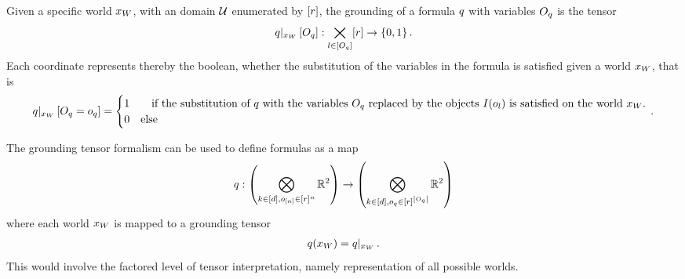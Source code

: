 \begin{definition}
    Given a specific world $x_{W}$, with an domain $\mathcal{U}$ enumerated by $[r]$, the grounding of a formula $q$ with variables $O_{q}$  is the tensor
    \begin{align*}
        {q}|_{x_{W}} \left[O_{q}\right] :
        \bigtimes_{l\in[O_{q}]} [r] \rightarrow \{0,1\} \, .
    \end{align*}
    Each coordinate represents thereby the boolean, whether the substitution of the variables in the formula is satisfied given a world $x_{W}$, that is
    \begin{align*}
        {q}|_{x_{W}} \left[O_{q}=o_{q}\right] =
        \begin{cases}
            1 & \quad \text{if the substitution of $q$ with the variables $O_{q}$ replaced by the objects $I(o_{l})$ is satisfied on the world $x_{W}$.} \\
            0 &  \text{else}
        \end{cases} \, .
    \end{align*}
\end{definition}

The grounding tensor formalism can be used to define formulas as a map
\begin{align*}
    q : \left(\bigotimes_{k\in[d],o_{[n]}\in[r]^{n}}\mathbb{R}^{2}\right)
    \rightarrow \left(\bigotimes_{k\in[d],o_{q}\in[r]^{\left|O_{q}\right|}}\mathbb{R}^{2}\right)
\end{align*}
where each world $x_{W}$ is mapped to a grounding tensor
\begin{align*}
    q(x_{W}) = {q}|_{x_{W}} \, .
\end{align*}
This would involve the factored level of tensor interpretation, namely representation of all possible worlds.


